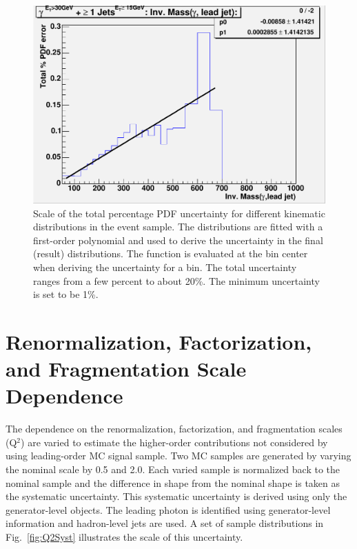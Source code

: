 \begin{figure}[p]
 \includegraphics[scale=0.36,keepaspectratio=true]{PDFsyst_pj1_InvM_phojet.pdf}
 \caption{Scale of the total percentage PDF uncertainty for different kinematic distributions in the \phoonejet event sample. The distributions are fitted with a first-order polynomial and used to derive the uncertainty in the final (result) distributions. The function is evaluated at the bin center when deriving the uncertainty for a bin. The total uncertainty ranges from a few percent to about 20\%. The minimum uncertainty is set to be 1\%.}
 \label{fig:PDFsyst}
\end{figure}

\section{Renormalization, Factorization, and Fragmentation Scale Dependence}
The dependence on the renormalization, factorization, and fragmentation scales (Q$^{2}$) are varied to estimate the higher-order contributions not considered by using leading-order MC signal sample. Two MC samples are generated by varying the nominal scale by 0.5 and 2.0. Each varied sample is normalized back to the nominal sample and the difference in shape from the nominal shape is taken as the systematic uncertainty. This systematic uncertainty is derived using only the generator-level objects. The leading photon is identified using generator-level information and hadron-level jets are used. A set of sample distributions in Fig.~\ref{fig:Q2Syst} illustrates the scale of this uncertainty.

